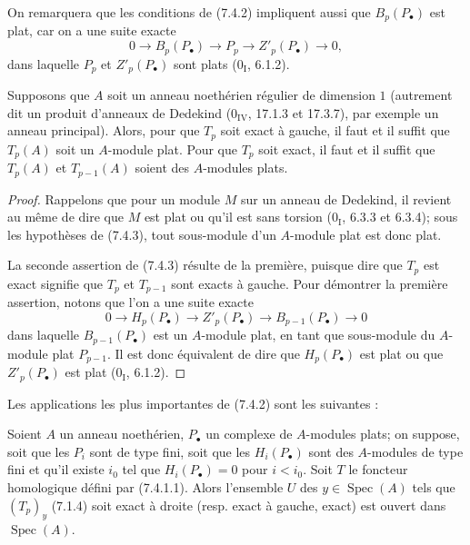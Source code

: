 On remarquera que les conditions de (7.4.2) impliquent aussi que
$B_p(P_\bullet)$ est plat, car on a une suite exacte
\[
  0\longrightarrow B_p(P_\bullet)\longrightarrow P_p
  \longrightarrow Z'_p(P_\bullet)\longrightarrow0,
\]
dans laquelle $P_p$ et $Z'_p(P_\bullet)$ sont plats ($0_{\mathrm I}$, 6.1.2).

\begin{corollary}[7.4.3]
Supposons que $A$ soit un anneau noethérien régulier de dimension $1$
(autrement dit un produit d'anneaux de Dedekind
($0_{\mathrm{IV}}$, 17.1.3 et 17.3.7), par exemple un anneau principal). Alors,
pour que $T_p$ soit exact à gauche, il faut et il suffit que $T_p(A)$ soit un
$A$-module plat. Pour que $T_p$ soit exact, il faut et il suffit que $T_p(A)$
et $T_{p-1}(A)$ soient des $A$-modules plats.
\end{corollary}

\begin{proof}
Rappelons que pour un module $M$ sur un anneau de Dedekind, il revient au même
de dire que $M$ est plat ou qu'il est sans torsion ($0_{\mathrm I}$, 6.3.3 et
6.3.4); sous les hypothèses de (7.4.3), tout sous-module d'un $A$-module plat
est donc plat.

La seconde assertion de (7.4.3) résulte de la première, puisque dire que $T_p$
est exact signifie que $T_p$ et $T_{p-1}$ sont exacts à gauche. Pour démontrer
la première assertion, notons que l'on a une suite exacte
\[
  0\longrightarrow H_p(P_\bullet)\longrightarrow Z'_p(P_\bullet)
  \longrightarrow B_{p-1}(P_\bullet)\longrightarrow0
\]
dans laquelle $B_{p-1}(P_\bullet)$ est un $A$-module plat, en tant que
sous-module du $A$-module plat $P_{p-1}$. Il est donc équivalent de dire que
$H_p(P_\bullet)$ est plat ou que $Z'_p(P_\bullet)$ est plat
($0_{\mathrm I}$, 6.1.2).
\end{proof}

Les applications les plus importantes de (7.4.2) sont les suivantes :

\begin{proposition}[7.4.4]
Soient $A$ un anneau noethérien, $P_\bullet$ un complexe de $A$-modules plats;
on suppose, soit que les $P_i$ sont de type fini, soit que les
$H_i(P_\bullet)$ sont des $A$-modules de type fini et qu'il existe $i_0$ tel
que $H_i(P_\bullet)=0$ pour $i<i_0$. Soit $T$ le foncteur homologique défini
par (7.4.1.1). Alors l'ensemble $U$ des
$y\in\operatorname{Spec}(A)$ tels que $(T_p)_y$ (7.1.4) soit exact à droite
(resp. exact à gauche, exact) est ouvert dans $\operatorname{Spec}(A)$.
\end{proposition}

